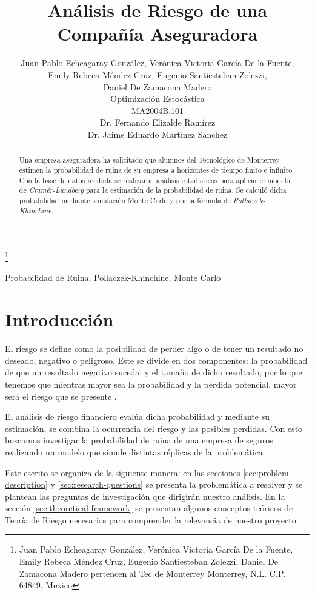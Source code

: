 \documentclass[journal]{IEEEtran}
\title{\LARGE \bf Análisis de Riesgo de una Compañía Aseguradora}
\author{Juan Pablo Echeagaray González, Verónica Victoria García De la Fuente, \\ Emily Rebeca Méndez Cruz, Eugenio Santiesteban Zolezzi, \\ Daniel De Zamacona Madero \\
Optimización Estocástica \\
MA2004B.101 \\
Dr. Fernando Elizalde Ramírez \\
Dr. Jaime Eduardo Martínez Sánchez}
\begin{document}
    \thanks{Juan Pablo Echeagaray González, Verónica Victoria García De la Fuente, Emily Rebeca Méndez Cruz, Eugenio Santiesteban Zolezzi, Daniel De Zamacona Madero pertencen al Tec de Monterrey Monterrey, N.L. C.P. 64849, Mexico {\tt\small}}
    
    \maketitle
    
    \thispagestyle{empty}
    \pagestyle{empty}
    \begin{abstract}
       Una empresa aseguradora ha solicitado que alumnos del Tecnológico de Monterrey estimen la probabilidad de ruina de su empresa a horizontes de tiempo finito e infinito. Con la base de datos recibida se realizaron análisis estadísticos para aplicar el modelo de \emph{Cramér-Lundberg} para la estimación de la probabilidad de ruina. Se calculó dicha probabilidad mediante simulación Monte Carlo y por la fórmula de \emph{Pollaczek-Khinchine}.
    \end{abstract}
    
    \begin{IEEEkeywords} 
        Probabilidad de Ruina, Pollaczek-Khinchine, Monte Carlo
    \end{IEEEkeywords}
    \section{Introducción} \label{sec:introduction}
    
        El riesgo se define como la posibilidad de perder algo o de tener un resultado no deseado, negativo o peligroso. Este se divide en dos componentes: la probabilidad de que un resultado negativo suceda, y el tamaño de dicho resultado; por lo que tenemos que mientras mayor sea la probabilidad y la pérdida potencial, mayor será el riesgo que se presente \cite{risk-definition}.
        
        El análisis de riesgo financiero evalúa dicha probabilidad y mediante su estimación, se combina la ocurrencia del riesgo y las posibles perdidas. Con esto buscamos investigar la probabilidad de ruina de una empresa de seguros realizando un modelo que simule distintas réplicas de la problemática.

        Este escrito se organiza de la siguiente manera: en las secciones \ref{sec:problem-description} y \ref{sec:research-questions} se presenta la problemática a resolver y se plantean las preguntas de investigación que dirigirán nuestro análisis. En la sección \ref{sec:theoretical-framework} se presentan algunos conceptos teóricos de Teoría de Riesgo necesarios para comprender la relevancia de nuestro proyecto.
\end{document}
